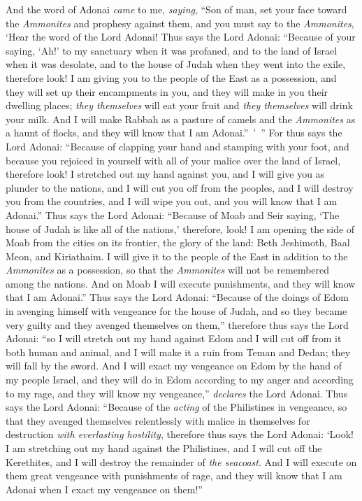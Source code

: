 \begin{biblechapter} %
 And the word of Adonai \textit{came} to me, \textit{saying},
\verse “Son of man, set your face toward the \textit{Ammonites} and prophesy against them,
\verse and you must say to the \textit{Ammonites}, ‘Hear the word of the Lord Adonai! Thus says the Lord Adonai: “Because of your saying, ‘Ah!’ to my sanctuary when it was profaned, and to the land of Israel when it was desolate, and to the house of Judah when they went into the exile,
\verse therefore look! I am giving you to the people of the East as a possession, and they will set up their encampments in you, and they will make in you their dwelling places; \textit{they themselves} will eat your fruit and \textit{they themselves} will drink your milk.
\verse And I will make Rabbah as a pasture of camels and the \textit{Ammonites} as a haunt of flocks, and they will know that I am Adonai.” ’ ”
\verse For thus says the Lord Adonai: “Because of clapping your hand and stamping with your foot, and because you rejoiced in yourself with all of your malice over the land of Israel,
\verse therefore look! I stretched out my hand against you, and I will give you as plunder to the nations, and I will cut you off from the peoples, and I will destroy you from the countries, and I will wipe you out, and you will know that I am Adonai.”
\verse Thus says the Lord Adonai: “Because of Moab and Seir saying, ‘The house of Judah is like all of the nations,’
\verse therefore, look! I am opening the side of Moab from the cities on its frontier, the glory of the land: Beth Jeshimoth, Baal Meon, and Kiriathaim.
\verse I will give it to the people of the East in addition to the \textit{Ammonites} as a possession, so that the \textit{Ammonites} will not be remembered among the nations.
\verse And on Moab I will execute punishments, and they will know that I am Adonai.”
\verse Thus says the Lord Adonai: “Because of the doings of Edom in avenging himself with vengeance for the house of Judah, and so they became very guilty and they avenged themselves on them,”
\verse therefore thus says the Lord Adonai: “so I will stretch out my hand against Edom and I will cut off from it both human and animal, and I will make it a ruin from Teman and Dedan; they will fall by the sword.
\verse And I will exact my vengeance on Edom by the hand of my people Israel, and they will do in Edom according to my anger and according to my rage, and they will know my vengeance,” \textit{declares} the Lord Adonai.
\verse Thus says the Lord Adonai: “Because of the \textit{acting} of the Philistines in vengeance, so that they avenged themselves relentlessly with malice in themselves for destruction \textit{with everlasting hostility},
\verse therefore thus says the Lord Adonai: ‘Look! I am stretching out my hand against the Philistines, and I will cut off the Kerethites, and I will destroy the remainder of \textit{the seacoast}.
\verse And I will execute on them great vengeance with punishments of rage, and they will know that I am Adonai when I exact my vengeance on them!”
\end{biblechapter}

